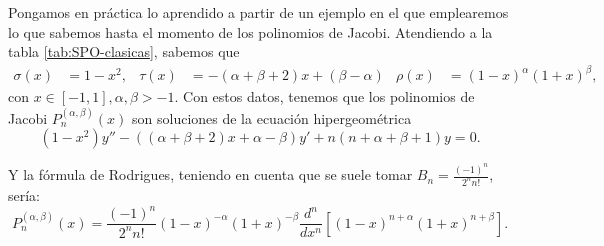 \begin{ejemplo}
    \label{ej:rodrigues-jacobi}
    Pongamos en práctica lo aprendido a partir de un ejemplo en el que emplearemos lo que sabemos hasta el momento de los polinomios de Jacobi. 
    Atendiendo a la tabla \ref{tab:SPO-clasicas}, sabemos que 
    \begin{align*}
        \sigma(x)&=1-x^2, & \tau(x) &=-(\alpha+\beta+2)x+(\beta-\alpha) & \rho(x)&=(1-x)^\alpha (1+x)^\beta,
    \end{align*}
    con $x\in[-1,1], \alpha,\beta>-1$. Con estos datos, tenemos que los polinomios de Jacobi $P_n^{(\alpha,\beta)}(x)$ son soluciones de la ecuación hipergeométrica
    $$
    (1-x^2)y''-((\alpha+\beta+2)x+ \alpha - \beta)y' + n(n+\alpha+\beta+1)y=0.
    $$
    
    Y la fórmula de Rodrigues, teniendo en cuenta que se suele tomar $B_n=\frac{(-1)^n}{2^n n!}$, sería:
    $$
    P_n^{(\alpha,\beta)}(x) = \frac{(-1)^n}{2^n n!} (1-x)^{-\alpha}(1+x)^{-\beta}\frac{d^n}{d x^n}\left[(1-x)^{n+\alpha}(1+x)^{n+\beta}\right].
    $$
\end{ejemplo}

